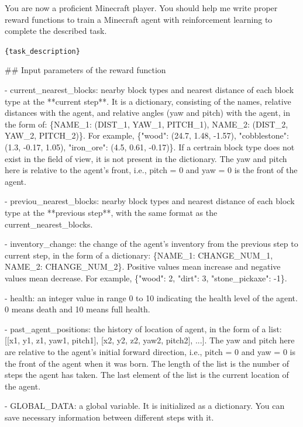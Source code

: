 

You are now a proficient Minecraft player. You should help me write proper reward functions to train a Minecraft agent with reinforcement learning to complete the described task.



\texttt{\{task\_description\}}



\#\# Input parameters of the reward function

- current\_nearest\_blocks: nearby block types and nearest distance of each block type at the **current step**. It is a dictionary, consisting of the names, relative distances with the agent, and relative angles (yaw and pitch) with the agent, in the form of: \{NAME\_1: (DIST\_1, YAW\_1, PITCH\_1), NAME\_2: (DIST\_2, YAW\_2, PITCH\_2)\}. For example, \{"wood": (24.7, 1.48, -1.57), "cobblestone": (1.3, -0.17, 1.05), "iron\_ore": (4.5, 0.61, -0.17)\}. If a certrain block type does not exist in the field of view, it is not present in the dictionary. The yaw and pitch here is relative to the agent's front, i.e., pitch = 0 and yaw = 0 is the front of the agent.

- previou\_nearest\_blocks: nearby block types and nearest distance of each block type at the **previous step**, with the same format as the current\_nearest\_blocks.

- inventory\_change: the change of the agent's inventory from the previous step to current step, in the form of a dictionary: \{NAME\_1: CHANGE\_NUM\_1, NAME\_2: CHANGE\_NUM\_2\}. Positive values mean increase and negative values mean decrease. For example, \{"wood": 2, "dirt": 3, "stone\_pickaxe": -1\}.

- health: an integer value in range 0 to 10 indicating the health level of the agent. 0 means death and 10 means full health.

- past\_agent\_positions: the history of location of agent, in the form of a list: [[x1, y1, z1, yaw1, pitch1], [x2, y2, z2, yaw2, pitch2], ...]. The yaw and pitch here are relative to the agent's initial forward direction, i.e., pitch = 0 and yaw = 0 is the front of the agent when it was born. The length of the list is the number of steps the agent has taken. The last element of the list is the current location of the agent.

- GLOBAL\_DATA: a global variable. It is initialized as a dictionary. You can save necessary information between different steps with it.





